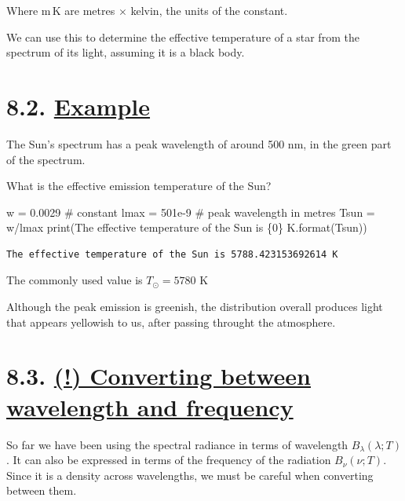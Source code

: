 \documentclass[
  letterpaper,
  DIV=11,
  numbers=noendperiod]{scrreprt}
\newenvironment{Shaded}{\begin{snugshade}}{\end{snugshade}}
\newcommand{\BuiltInTok}[1]{\textcolor[rgb]{0.00,0.23,0.31}{#1}}
\newcommand{\CommentTok}[1]{\textcolor[rgb]{0.37,0.37,0.37}{#1}}
\newcommand{\FloatTok}[1]{\textcolor[rgb]{0.68,0.00,0.00}{#1}}
\newcommand{\NormalTok}[1]{\textcolor[rgb]{0.00,0.23,0.31}{#1}}
\newcommand{\OperatorTok}[1]{\textcolor[rgb]{0.37,0.37,0.37}{#1}}
\newcommand{\SpecialCharTok}[1]{\textcolor[rgb]{0.37,0.37,0.37}{#1}}
\newcommand{\StringTok}[1]{\textcolor[rgb]{0.13,0.47,0.30}{#1}}
\begin{document}
Where \(\mathrm{m\,K}\) are metres \(\times\) kelvin, the units of the
constant.

We can use this to determine the effective temperature of a star from
the spectrum of its light, assuming it is a black body.

\hypertarget{example-2}{%
\section{\texorpdfstring{8.2.
\protect\hyperlink{toc0_}{Example}}{8.2. Example}}\label{example-2}}

The Sun's spectrum has a peak wavelength of around 500 nm, in the green
part of the spectrum.

What is the effective emission temperature of the Sun?

\begin{Shaded}
\begin{Highlighting}[]
\NormalTok{w }\OperatorTok{=} \FloatTok{0.0029} \CommentTok{\# constant}
\NormalTok{lmax }\OperatorTok{=} \FloatTok{501e{-}9} \CommentTok{\# peak wavelength in metres}
\NormalTok{Tsun }\OperatorTok{=}\NormalTok{ w}\OperatorTok{/}\NormalTok{lmax}
\BuiltInTok{print}\NormalTok{(}\StringTok{\textquotesingle{}The effective temperature of the Sun is }\SpecialCharTok{\{0\}}\StringTok{ K\textquotesingle{}}\NormalTok{.}\BuiltInTok{format}\NormalTok{(Tsun))}
\end{Highlighting}
\end{Shaded}

\begin{verbatim}
The effective temperature of the Sun is 5788.423153692614 K
\end{verbatim}

The commonly used value is \(T_\odot=5780\) K

Although the peak emission is greenish, the distribution overall
produces light that appears yellowish to us, after passing throught the
atmosphere.

\hypertarget{converting-between-wavelength-and-frequency}{%
\section{\texorpdfstring{8.3. \protect\hyperlink{toc0_}{(!) Converting
between wavelength and
frequency}}{8.3. (!) Converting between wavelength and frequency}}\label{converting-between-wavelength-and-frequency}}

So far we have been using the spectral radiance in terms of wavelength
\(B_\lambda(\lambda;T)\). It can also be expressed in terms of the
frequency of the radiation \(B_\nu(\nu;T)\). Since it is a density
across wavelengths, we must be careful when converting between them.
\end{document}
